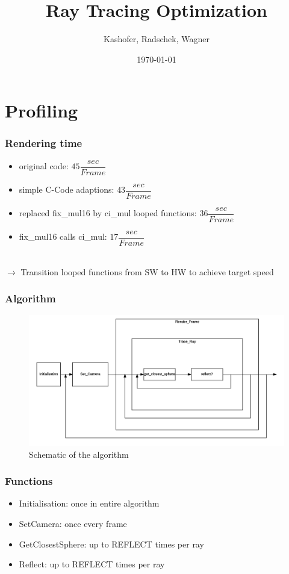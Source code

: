 \documentclass{beamer}
\title{Ray Tracing Optimization}
\author{Kashofer, Radschek, Wagner}
\date{\today}
\begin{document}
\maketitle
\frame{\tableofcontents[currentsection]}
 
\section{Profiling}
\begin{frame} %
	\frametitle{Rendering time} %
  	\begin{itemize}
		\item original code: $45 \dfrac{sec}{Frame}$
		\item simple C-Code adaptions: $43 \dfrac{sec}{Frame}$
		\item replaced fix\_mul16 by ci\_mul looped functions: $36 \dfrac{sec}{Frame}$
		\item fix\_mul16 calls ci\_mul: $17 \dfrac{sec}{Frame}$
	\end{itemize}
	$\quad$\\
	$\rightarrow$ Transition looped functions from SW to HW to achieve target speed
\end{frame}

\begin{frame} %
	\frametitle{Algorithm} %
  	\begin{figure}
		\includegraphics[width=\textwidth]{algo.png}
		\caption{Schematic of the algorithm}
	\label{fig1}
	\end{figure}
\end{frame}


\begin{frame} %
	\frametitle{Functions} %
  	\begin{itemize}
		\item Initialisation: once in entire algorithm
		\item SetCamera: once every frame
		\item GetClosestSphere: up to REFLECT times per ray
		\item Reflect: up to REFLECT times per ray
	\end{itemize}
\end{frame}
\end{document}
